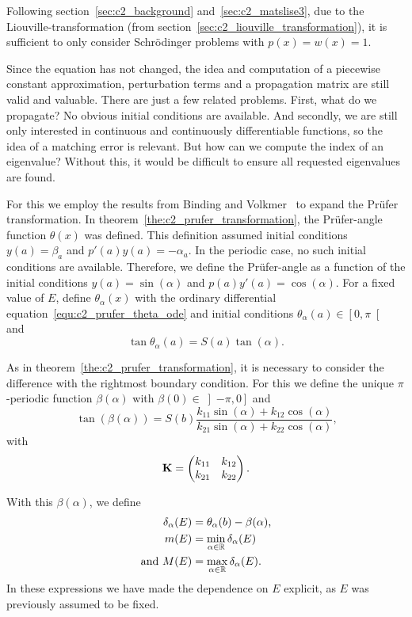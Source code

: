 Following section~\ref{sec:c2_background} and~\ref{sec:c2_matslise3}, due to the Liouville-transformation (from section~\ref{sec:c2_liouville_transformation}), it is sufficient to only consider Schrödinger problems with $p(x) = w(x) = 1$.

Since the equation has not changed, the idea and computation of a piecewise constant approximation, perturbation terms and a propagation matrix are still valid and valuable. There are just a few related problems. First, what do we propagate? No obvious initial conditions are available. And secondly, we are still only interested in continuous and continuously differentiable functions, so the idea of a matching error is relevant. But how can we compute the index of an eigenvalue? Without this, it would be difficult to ensure all requested eigenvalues are found.

For this we employ the results from Binding and Volkmer~\cite{binding_prufer_2012,binding_prufer_2013} to expand the Prüfer transformation. In theorem~\ref{the:c2_prufer_transformation}, the Prüfer-angle function $\theta(x)$ was defined. This definition assumed initial conditions $y(a) = \beta_a$ and $p'(a)y(a) = -\alpha_a$. In the periodic case, no such initial conditions are available. Therefore, we define the Prüfer-angle as a function of the initial conditions $y(a) = \sin(\alpha)$ and $p(a)y'(a) = \cos(\alpha)$. For a fixed value of $E$, define $\theta_\alpha(x)$ with the ordinary differential equation~\eqref{equ:c2_prufer_theta_ode} and initial conditions $\theta_\alpha(a) \in \left[0, \pi\right[$ and
                $$
                    \tan\theta_\alpha(a) = S(a) \tan(\alpha)\text{.}
                $$

                As in theorem~\ref{the:c2_prufer_transformation}, it is necessary to consider the difference with the rightmost boundary condition. For this we define the unique $\pi$-periodic function $\beta(\alpha)$ with $\beta(0) \in \left]-\pi, 0\right]$ and
$$
    \tan(\beta(\alpha)) = S(b)\frac{k_{11} \sin(\alpha) + k_{12} \cos(\alpha)}{k_{21} \sin(\alpha) + k_{22} \cos(\alpha)}\text{,}
$$
with
$$
    \vb{K} = \begin{pmatrix}
        k_{11} & k_{12} \\ k_{21} & k_{22}
    \end{pmatrix}\text{.}
$$

With this $\beta(\alpha)$, we define
\begin{align}
    \delta_\alpha(E) & = \theta_\alpha(b) - \beta(\alpha)\text{,} \nonumber                           \\
    m(E)             & = \min_{\alpha \in \mathbb{R}} \delta_\alpha(E) \nonumber                             \\
    \text{and }M(E)  & = \max_{\alpha \in \mathbb{R}}\delta_\alpha(E)\text{.}\label{equ:c2_periodic_m_and_m}
\end{align}
In these expressions we have made the dependence on $E$ explicit, as $E$ was previously assumed to be fixed.

